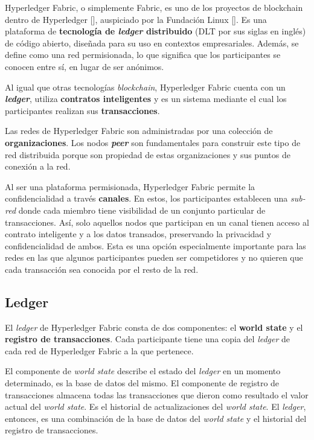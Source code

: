 Hyperledger Fabric, o simplemente Fabric, es uno de los proyectos de blockchain dentro de Hyperledger [\cite{hyperledger-foundation}], auspiciado por la Fundación Linux [\cite{linux-foundation}]. Es una plataforma de \textbf{tecnología de \textit{ledger} distribuido} (DLT por sus siglas en inglés) de código abierto, diseñada para su uso en contextos empresariales. Además, se define como una red permisionada, lo que significa que los participantes se conocen entre sí, en lugar de ser anónimos. 

Al igual que otras tecnologías \textit{blockchain}, Hyperledger Fabric cuenta con un \textit{\textbf{ledger}}, utiliza \textbf{contratos inteligentes} y es un sistema mediante el cual los participantes realizan sus \textbf{transacciones}.

Las redes de Hyperledger Fabric son administradas por una colección de \textbf{organizaciones}. Los nodos \textit{\textbf{peer}} son fundamentales para construir este tipo de red distribuida porque son propiedad de estas organizaciones y sus puntos de conexión a la red. 

Al ser una plataforma permisionada, Hyperledger Fabric permite la confidencialidad a través \textbf{canales}. En estos, los participantes establecen una \textit{sub-red} donde cada miembro tiene visibilidad de un conjunto particular de transacciones. Así, solo aquellos nodos que participan en un canal tienen acceso al contrato inteligente y a los datos transados, preservando la privacidad y confidencialidad de ambos.
Esta es una opción especialmente importante para las redes en las que algunos participantes pueden ser competidores y no quieren que cada transacción sea conocida por el resto de la red. 


\subsection*{Ledger}

El \textit{ledger} de Hyperledger Fabric consta de dos componentes: el \textbf{world state} y el \textbf{registro de transacciones}. Cada participante tiene una copia del \textit{ledger} de cada red de Hyperledger Fabric a la que pertenece.

El componente de \textit{world state} describe el estado del \textit{ledger} en un momento determinado, es la base de datos del mismo. El componente de registro de transacciones almacena todas las transacciones que dieron como resultado el valor actual del \textit{world state}. Es el historial de actualizaciones del \textit{world state}. El \textit{ledger}, entonces, es una combinación de la base de datos del \textit{world state} y el historial del registro de transacciones.

